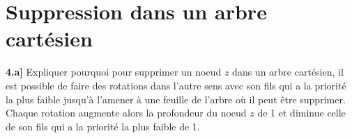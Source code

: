 \documentclass[a4paper,12pt]{report}
\begin{document}

\newpage

\renewcommand{\chaptername}{Exercice}
\chapter{Suppression dans un arbre cartésien}





\textbf{4.a]} Expliquer pourquoi pour supprimer un noeud \( z \) dans un arbre cartésien, il est possible de faire des rotations dans l'autre sens avec son 
    fils qui a la priorité la plus faible jusqu'à l'amener à une feuille de l'arbre où il peut être supprimer. Chaque rotation augmente alors la profondeur
    du noeud \( z \) de 1 et diminue celle de son fils qui a la priorité la plus faible de 1. 
\end{document}
